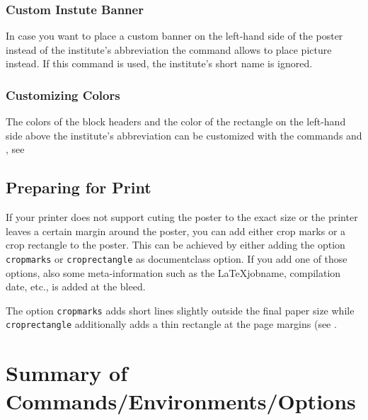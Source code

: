 \subsubsection{Custom Instute Banner}

In case you want to place a custom banner on the left-hand side of the poster instead of the institute's abbreviation the command \texttt{} allows to place picture instead. If this command is used, the institute's short name is ignored.


\subsubsection{Customizing Colors}

The colors of the block headers and the color of the rectangle on the left-hand side above the institute's abbreviation can be customized with the commands \texttt{} and \texttt{}, see 



\subsection{Preparing for Print}

If your printer does not support cuting the poster to the exact size or the printer leaves a certain margin around the poster, you can add either crop marks or a crop rectangle to the poster. This can be achieved by either adding the option \texttt{cropmarks} or \texttt{croprectangle} as documentclass option. If you add one of those options, also some meta-information such as the \LaTeX jobname, compilation date, etc., is added at the bleed.

The option \texttt{cropmarks} adds short lines slightly outside the final paper size while \texttt{croprectangle} additionally adds a thin rectangle at the page margins (see .

\section{Summary of Commands/Environments/Options}
\label{sec:reference}


